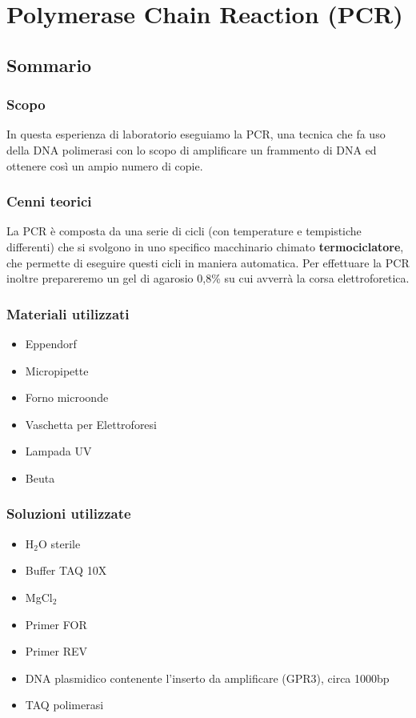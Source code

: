 \chapter{Polymerase Chain Reaction (PCR)}

\vspace{0.6cm}


\section{Sommario}

\subsection{Scopo}

In questa esperienza di laboratorio eseguiamo la PCR, una tecnica che fa uso della
DNA polimerasi con lo scopo di amplificare un frammento di DNA ed ottenere così un
ampio numero di copie.\\

\subsection{Cenni teorici}

La PCR è composta da una serie di cicli (con temperature e tempistiche differenti)
che si svolgono in uno specifico macchinario chimato \textbf{termociclatore},
che permette di eseguire questi cicli in maniera automatica.
Per effettuare la PCR inoltre prepareremo un gel di agarosio 0,8\%
su cui avverrà la corsa elettroforetica.

\subsection{Materiali utilizzati}

\begin{itemize}
	\item Eppendorf
	\item Micropipette
	\item Forno microonde
	\item Vaschetta per Elettroforesi
	\item Lampada UV
	\item Beuta
\end{itemize}

\subsection{Soluzioni utilizzate}
\begin{itemize}
	\item H$_2$O sterile
	\item Buffer TAQ 10X
	\item MgCl$_2$
	\item Primer FOR
	\item Primer REV
	\item DNA plasmidico contenente l'inserto da amplificare (GPR3), circa 1000bp
	\item TAQ polimerasi
\end{itemize}

